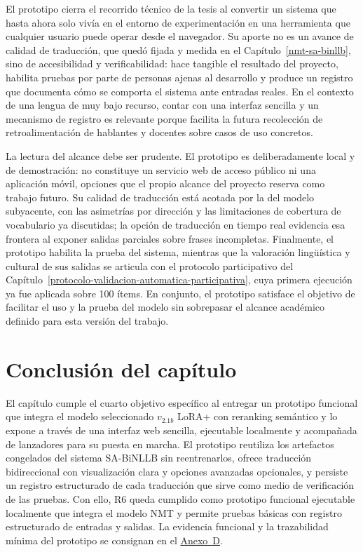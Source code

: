 \documentclass[12pt,a4paper,oneside]{book}
\begin{document}
El prototipo cierra el recorrido técnico de la tesis al convertir un sistema que hasta ahora solo vivía en el entorno de experimentación en una herramienta que cualquier usuario puede operar desde el navegador. Su aporte no es un avance de calidad de traducción, que quedó fijada y medida en el Capítulo~\ref{nmt-sa-binllb}, sino de accesibilidad y verificabilidad: hace tangible el resultado del proyecto, habilita pruebas por parte de personas ajenas al desarrollo y produce un registro que documenta cómo se comporta el sistema ante entradas reales. En el contexto de una lengua de muy bajo recurso, contar con una interfaz sencilla y un mecanismo de registro es relevante porque facilita la futura recolección de retroalimentación de hablantes y docentes sobre casos de uso concretos.

La lectura del alcance debe ser prudente. El prototipo es deliberadamente local y de demostración: no constituye un servicio web de acceso público ni una aplicación móvil, opciones que el propio alcance del proyecto reserva como trabajo futuro. Su calidad de traducción está acotada por la del modelo subyacente, con las asimetrías por dirección y las limitaciones de cobertura de vocabulario ya discutidas; la opción de traducción en tiempo real evidencia esa frontera al exponer salidas parciales sobre frases incompletas. Finalmente, el prototipo habilita la prueba del sistema, mientras que la valoración lingüística y cultural de sus salidas se articula con el protocolo participativo del Capítulo~\ref{protocolo-validacion-automatica-participativa}, cuya primera ejecución ya fue aplicada sobre 100 ítems. En conjunto, el prototipo satisface el objetivo de facilitar el uso y la prueba del modelo sin sobrepasar el alcance académico definido para esta versión del trabajo.

\section{Conclusión del capítulo}\label{prototipo-conclusion-capitulo}

El capítulo cumple el cuarto objetivo específico al entregar un prototipo funcional que integra el modelo seleccionado \(v_{2.1b}\) LoRA+ con reranking semántico y lo expone a través de una interfaz web sencilla, ejecutable localmente y acompañada de lanzadores para su puesta en marcha. El prototipo reutiliza los artefactos congelados del sistema SA-BiNLLB sin reentrenarlos, ofrece traducción bidireccional con visualización clara y opciones avanzadas opcionales, y persiste un registro estructurado de cada traducción que sirve como medio de verificación de las pruebas. Con ello, R6 queda cumplido como prototipo funcional ejecutable localmente que integra el modelo NMT y permite pruebas básicas con registro estructurado de entradas y salidas. La evidencia funcional y la trazabilidad mínima del prototipo se consignan en el \hyperref[anexo-prototipo]{Anexo~D}.
\end{document}
